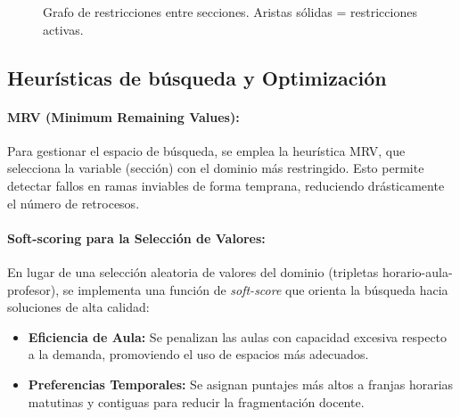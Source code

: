 \documentclass[12pt,twoside]{report}
\theoremstyle{definition}
\begin{document}
\begin{figure}[H]
\centering
{}
\caption{Grafo de restricciones entre secciones.  Aristas s\'olidas = restricciones activas.}
\label{fig:grafo}
\end{figure}

\subsection{Heur\'isticas de b\'usqueda y Optimizaci\'on}

\paragraph{MRV (Minimum Remaining Values):}
Para gestionar el espacio de b\'usqueda, se emplea la heur\'istica MRV, que selecciona la variable (secci\'on) con el dominio m\'as restringido. Esto permite detectar fallos en ramas inviables de forma temprana, reduciendo dr\'asticamente el n\'umero de retrocesos.

\paragraph{Soft-scoring para la Selecci\'on de Valores:}
En lugar de una selecci\'on aleatoria de valores del dominio (tripletas horario-aula-profesor), se implementa una funci\'on de \emph{soft-score} que orienta la b\'usqueda hacia soluciones de alta calidad:
\begin{itemize}
    \item \textbf{Eficiencia de Aula:} Se penalizan las aulas con capacidad excesiva respecto a la demanda, promoviendo el uso de espacios m\'as adecuados.
    \item \textbf{Preferencias Temporales:} Se asignan puntajes m\'as altos a franjas horarias matutinas y contiguas para reducir la fragmentaci\'on docente.
\end{itemize}
\end{document}

